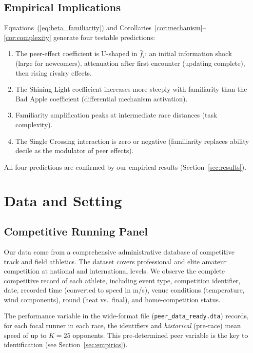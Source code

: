 \documentclass[12pt]{article}
\theoremstyle{definition}
\theoremstyle{remark}
\begin{document}
\subsection{Empirical Implications}

Equations~(\ref{eq:beta_familiarity}) and Corollaries~\ref{cor:mechanism}--\ref{cor:complexity}
generate four testable predictions:
\begin{enumerate}[leftmargin=0.5in, label=(P\arabic*)]
\item The peer-effect coefficient is U-shaped in $\bar{f}_i$: an initial
      information shock (large for newcomers), attenuation after first encounter
      (updating complete), then rising rivalry effects.
\item The Shining Light coefficient increases more steeply with familiarity
      than the Bad Apple coefficient (differential mechanism activation).
\item Familiarity amplification peaks at intermediate race distances (task complexity).
\item The Single Crossing interaction is zero or negative (familiarity replaces
      ability decile as the modulator of peer effects).
\end{enumerate}
All four predictions are confirmed by our empirical results (Section~\ref{sec:results}).

\section{Data and Setting}
\label{sec:data}

\subsection{Competitive Running Panel}

Our data come from a comprehensive administrative database of competitive track
and field athletics.
The dataset covers professional and elite amateur competition at national and
international levels.
We observe the complete competitive record of each athlete, including event type,
competition identifier, date, recorded time (converted to speed in m/s),
venue conditions (temperature, wind components), round (heat vs.\ final),
and home-competition status.

The performance variable in the wide-format file (\texttt{peer\_data\_ready.dta})
records, for each focal runner in each race, the identifiers and
\emph{historical} (pre-race) mean speed of up to $K = 25$ opponents.
This pre-determined peer variable is the key to identification (see Section~\ref{sec:empirics}).
\end{document}
